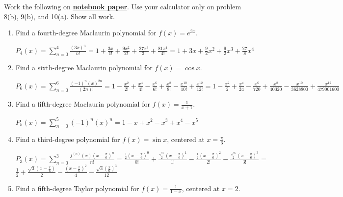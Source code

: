 \documentclass[10pt,letterpaper]{report}
\begin{document}
\noindent Work the following on \textbf{\underline{notebook paper}}. Use your calculator only on problem 8(b), 9(b), and 10(a). Show all work. \\
\begin{enumerate}
  \item{Find a fourth-degree Maclaurin polynomial for $f(x)=e^{3x}$. \\}
  
    $P_{4}(x) = \sum_{n=0}^{4}{\frac{(3x)^{n}}{n!}} = 
    1 + \frac{3x}{1!} + \frac{9x^{2}}{2!} + \frac{27x^{3}}{3!} + \frac{81x^{4}}{4!}=
    1 + 3x + \frac{9}{2}x^{2} + \frac{9}{2}x^{3} + \frac{27}{8}x^{4}$ \\
    
  \item{Find a sixth-degree Maclaurin polynomial for $f(x)=\cos{x}$. \\}
  
    $P_{6}(x) = \sum_{n=0}^{6}{\frac{(-1)^{n}(x)^{2n}}{(2n)!}} = 
    1 - \frac{x^{2}}{2!} + \frac{x^{4}}{4!} - \frac{x^{6}}{6!} + \frac{x^{8}}{8!} - \frac{x^{10}}{10!} + \frac{x^{12}}{12!} = 
    1 - \frac{x^{2}}{2} + \frac{x^{4}}{24} - \frac{x^{6}}{720} + \frac{x^{8}}{40320} - \frac{x^{10}}{3628800} + \frac{x^{12}}{479001600}$ \\
    
  \item{Find a fifth-degree Maclaurin polynomial for $f(x)=\frac{1}{x+1}$. \\}
  
    $P_{5}(x) = \sum_{n=0}^{5}{(-1)^{n}(x)^{n}} = 
    1 - x + x^{2} - x^{3} + x^{4} - x^{5}$ \\
    
  \item{Find a third-degree polynomial for $f(x)=\sin{x}$, centered at $x=\frac{\pi}{6}$. \\}
  
    $P_{3}(x) = \sum_{n=0}^{3}{\frac{f^{(n)}(x)(x-\frac{\pi}{6})^{n}}{n!}} = 
    \frac{\frac{1}{2}(x-\frac{\pi}{6})^{0}}{0!} + \frac{\frac{\sqrt{3}}{2}(x-\frac{\pi}{6})^{1}}{1!} - \frac{\frac{1}{2}(x-\frac{\pi}{6})^{2}}{2!} - \frac{\frac{\sqrt{3}}{2}(x-\frac{\pi}{6})^{3}}{3!} = $ \\
    
    $\frac{1}{2} + \frac{\sqrt{3}(x-\frac{\pi}{6})}{2} - \frac{(x-\frac{\pi}{6})^{2}}{4} - \frac{\sqrt{3}(\frac{\pi}{6})^{3}}{12}$ \\
    
  \item{Find a fifth-degree Taylor polynomial for $f(x)=\frac{1}{1-x}$, centered at $x=2$. \\}
  

\end{enumerate}
\end{document}
